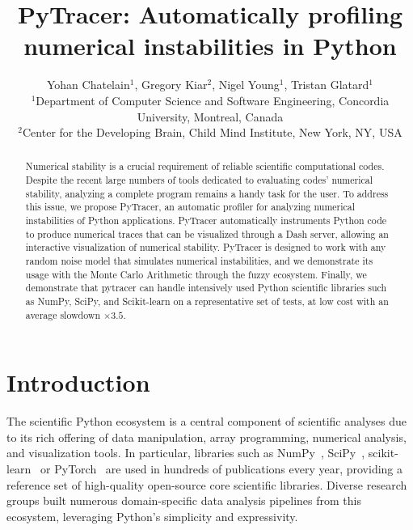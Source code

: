 \documentclass[11pt]{article}
\newcommand{\pytracer}[0]{PyTracer\xspace}
\begin{document}
\makeatletter
\let\orig@lstnumber=\thelstnumber
\newcommand\lstsetnumber[1]{\gdef\thelstnumber{#1}}
\newcommand\lstresetnumber{\global\let\thelstnumber=\orig@lstnumber}
\makeatother

\title{PyTracer: Automatically profiling numerical instabilities in Python}
\author{Yohan Chatelain$^1$, Gregory Kiar$^2$, Nigel Young$^1$, Tristan Glatard$^1$\\
$^1$Department of Computer Science and Software Engineering, Concordia University, Montreal, Canada\\
$^2$Center for the Developing Brain, Child Mind Institute, New York, NY, USA}
\date{}
\maketitle

\begin{abstract}
Numerical stability is a crucial requirement of reliable scientific computational codes. Despite the recent large numbers of tools dedicated to evaluating codes' numerical stability, analyzing a complete program remains a handy task for the user. To address this issue, we propose \pytracer, an automatic profiler for analyzing numerical instabilities of Python applications. \pytracer automatically instruments Python code to produce numerical traces that can be visualized through a Dash server, allowing an interactive visualization of numerical stability.
\pytracer is designed to work with any random noise model that simulates numerical instabilities, and we demonstrate its usage with the Monte Carlo Arithmetic through the fuzzy ecosystem.
Finally, we demonstrate that pytracer can handle intensively used Python scientific libraries such as NumPy, SciPy, and Scikit-learn on a representative set of tests, at low cost with an average slowdown $\times 3.5$.
\end{abstract}

\section{Introduction}

The scientific Python ecosystem is a central component of scientific
analyses due to its rich offering of data manipulation, array programming,
numerical analysis, and visualization tools. In particular, libraries such
as NumPy~\cite{harris2020array}, SciPy~\cite{virtanen2020scipy}, scikit-learn~\cite{pedregosa2011scikit} or PyTorch~\cite{paszke2019pytorch} are used in hundreds of publications every year, providing a reference set of high-quality open-source core scientific libraries. Diverse research groups built numerous domain-specific data analysis pipelines from this ecosystem, leveraging Python's simplicity and expressivity. 
\end{document}

